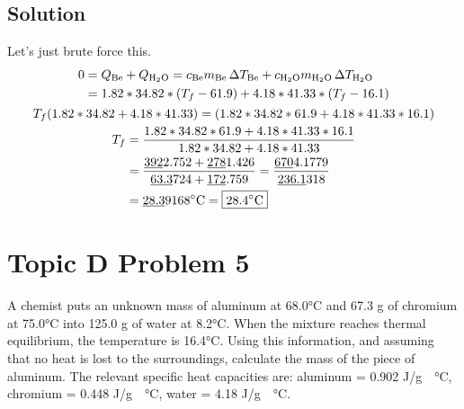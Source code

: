 \documentclass[10pt]{article}
\newcommand{\U}[1]{\underline{#1}}
\begin{document}
        \subsection{Solution}
            Let's just brute force this.
            \begin{gather}
                \begin{align}
                    0   &=  Q_{\rm Be} + Q_{\rm H_2 O}
                        =   c_{\rm Be}m_{\rm Be}\,\Delta T_{\rm Be} + c_{\rm H_2 O}m_{\rm H_2 O}\,\Delta T_{\rm H_2 O}\\
                        &=  1.82 * 34.82 * (T_f - 61.9) + 4.18 * 41.33 * (T_f - 16.1)
                \end{align}\\
                T_f (1.82 * 34.82 + 4.18 * 41.33)   =   (1.82 * 34.82 * 61.9 + 4.18 * 41.33 * 16.1)\\
                \begin{align}
                    T_f &=  \frac{1.82 * 34.82 * 61.9 + 4.18 * 41.33 * 16.1}{1.82 * 34.82 + 4.18 * 41.33}\\
                        &=  \frac{\U{392}2.752 + \U{278}1.426}{\U{63.3}724 + \U{172}.759}
                        =   \frac{\U{670}4.1779}{\U{236.1}318}\\
                        &=  \U{28.3}9168\unit{\celsius}
                        =   \boxed{28.4\unit{\celsius}}
                \end{align}
            \end{gather}

    \pagebreak
    \section{Topic D Problem 5}
        A chemist puts an unknown mass of aluminum at 68.0\unit{\celsius} and 67.3 g of chromium at 75.0\unit{\celsius} into 125.0 g of water at 8.2\unit{\celsius}. 
        When the mixture reaches thermal equilibrium, the temperature is 16.4\unit{\celsius}. 
        Using this information, and assuming that no heat is lost to the surroundings, calculate the mass of the piece of aluminum. 
        The relevant specific heat capacities are: aluminum = 0.902 \unit{\joule/\gram\cdot\celsius}, chromium = 0.448 \unit{\joule/\gram\cdot\celsius}, water = 4.18 \unit{\joule/\gram\cdot\celsius}.
\end{document}
